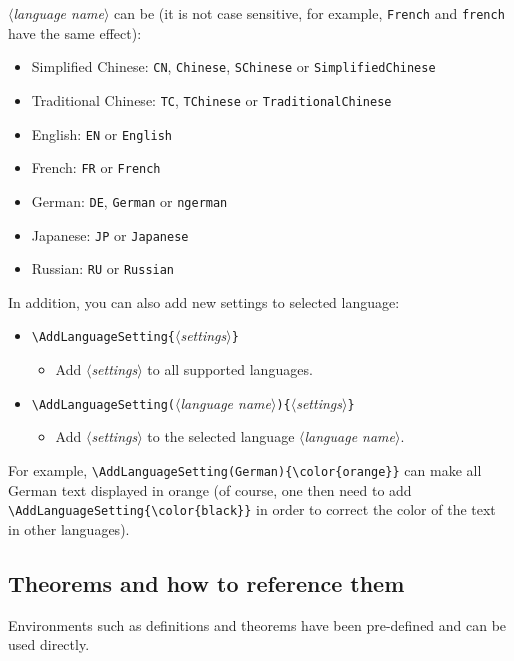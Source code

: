 \documentclass[allowbf]{colorart}
\providecommand{\meta}[1]{$\langle${\normalfont\itshape#1}$\rangle$}
\begin{document}
\clearpage
\meta{language name} can be (it is not case sensitive, for example, \texttt{French} and \texttt{french} have the same effect):
\begin{itemize}
    \item Simplified Chinese: \texttt{CN}, \texttt{Chinese}, \texttt{SChinese} or \texttt{SimplifiedChinese}
    \item Traditional Chinese: \texttt{TC}, \texttt{TChinese} or \texttt{TraditionalChinese}
    \item English: \texttt{EN} or \texttt{English}
    \item French: \texttt{FR} or \texttt{French}
    \item German: \texttt{DE}, \texttt{German} or \texttt{ngerman}
    \item Japanese: \texttt{JP} or \texttt{Japanese}
    \item Russian: \texttt{RU} or \texttt{Russian}
\end{itemize}

\medskip
In addition, you can also add new settings to selected language:
\begin{itemize}
    \item \lstinline|\AddLanguageSetting{|\meta{settings}\lstinline|}|
    \begin{itemize}
        \item Add \meta{settings} to all supported languages.
    \end{itemize}
    \item \lstinline|\AddLanguageSetting(|\meta{language name}\lstinline|){|\meta{settings}\lstinline|}|
    \begin{itemize}
        \item Add \meta{settings} to the selected language \meta{language name}.
    \end{itemize}
\end{itemize}
For example, \lstinline|\AddLanguageSetting(German){\color{orange}}| can make all German text displayed in orange (of course, one then need to add \lstinline|\AddLanguageSetting{\color{black}}| in order to correct the color of the text in other languages).


\subsection{Theorems and how to reference them}

Environments such as definitions and theorems have been pre-defined and can be used directly. 
\end{document}

